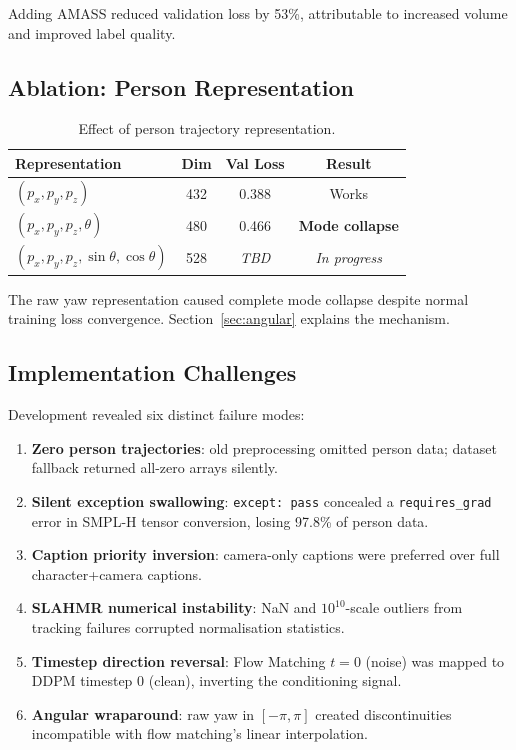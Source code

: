 \documentclass[10pt,twocolumn,letterpaper]{article}
\begin{document}
Adding AMASS reduced validation loss by 53\%, attributable to increased volume and improved label quality.

\subsection{Ablation: Person Representation}

\begin{table}[t]
\centering
\caption{Effect of person trajectory representation.}
\label{tab:repr}
\begin{tabular}{@{}lccc@{}}
\toprule
Representation & Dim & Val Loss & Result \\
\midrule
$(p_x, p_y, p_z)$ & 432 & 0.388 & Works \\
$(p_x, p_y, p_z, \theta)$ & 480 & 0.466 & \textbf{Mode collapse} \\
$(p_x, p_y, p_z, \sin\theta, \cos\theta)$ & 528 & \textit{TBD} & \textit{In progress} \\
\bottomrule
\end{tabular}
\end{table}

The raw yaw representation caused complete mode collapse despite normal training loss convergence. Section~\ref{sec:angular} explains the mechanism.

\subsection{Implementation Challenges}
\label{sec:timestep_bug}

Development revealed six distinct failure modes:

\begin{enumerate}
\item \textbf{Zero person trajectories}: old preprocessing omitted person data; dataset fallback returned all-zero arrays silently.
\item \textbf{Silent exception swallowing}: \texttt{except: pass} concealed a \texttt{requires\_grad} error in SMPL-H tensor conversion, losing 97.8\% of person data.
\item \textbf{Caption priority inversion}: camera-only captions were preferred over full character+camera captions.
\item \textbf{SLAHMR numerical instability}: NaN and $10^{10}$-scale outliers from tracking failures corrupted normalisation statistics.
\item \textbf{Timestep direction reversal}: Flow Matching $t{=}0$ (noise) was mapped to DDPM timestep 0 (clean), inverting the conditioning signal.
\item \textbf{Angular wraparound}: raw yaw in $[-\pi, \pi]$ created discontinuities incompatible with flow matching's linear interpolation.
\end{enumerate}
\end{document}
